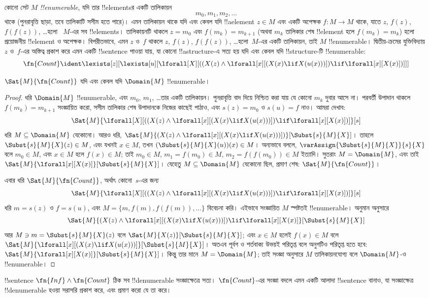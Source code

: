 \documentclass[../../../include/open-logic-section]{subfiles}
\begin{document}
কোনো সেট $M$ \emph{!!{enumerable}}, যদি তার !!{element}sর একটি
তালিকায়ন
\[
m_0, m_1, m_2, \dots
\]
থাকে (পুনরাবৃত্তি ছাড়া, তবে তালিকাটি সসীম হতে পারে)। এমন তালিকায়ন
থাকে যদি এবং কেবল যদি !!a{element} $z \in M$ এবং একটি অপেক্ষক
$f\colon M \to M$ থাকে, যাতে $z$, $f(z)$, $f(f(z))$, \dots হলো
~$M$-এর সব !!{element}s। তালিকায়নটি থাকলে $z = m_0$ এবং
$f(m_k) = m_{k+1}$ (অথবা $m_k$ তালিকার শেষ !!{element} হলে
$f(m_k) = m_k$) হলো প্রয়োজনীয় !!{element} ও অপেক্ষক। বিপরীতভাবে, এমন
$z$ ও~$f$ থাকলে $z$, $f(z)$, $f(f(z))$, \dots হলো~$M$-এর একটি
তালিকায়ন, তাই $M$ !!{enumerable}। দ্বিতীয়-ক্রমের যুক্তিবিদ্যায় $z$
ও~$f$-এর অস্তিত্ব প্রকাশ করে এমন একটি !!{sentence} পাওয়া যায়, যা
কোনো !!a{structure}-এ সত্য হয় যদি এবং কেবল যদি !!{structure}-টি
!!{enumerable}:
\[
\fn{Count} \ident
\lexists[z][\lexists[u][\lforall[X][((X(z) \land
      \lforall[x][(X(x) \lif X(u(x)))]) \lif \lforall[x][X(x)])]]]
\]

\begin{prop}
$\Sat{M}{\fn{Count}}$ যদি এবং কেবল যদি $\Domain{M}$
!!{enumerable}।
\end{prop}

\begin{proof}
ধরি $\Domain{M}$ !!{enumerable}, এবং $m_0$, $m_1$, \dots তার একটি
তালিকায়ন। পুনরাবৃত্তি বাদ দিয়ে নিশ্চিত করা যায় যে কোনো $m_k$ দুবার
আসে না। পরবর্তী উপাদান থাকলে $f(m_k) = m_{k+1}$ সংজ্ঞায়িত করো, সসীম
তালিকার শেষ উপাদানকে নিজের কাছেই পাঠাও, এবং $s(z) = m_0$ ও
$s(u) = f$ নাও। আমরা দেখাব:
\[
\Sat{M}{\lforall[X][((X(z) \land \lforall[x][(X(x) \lif X(u(x)))])
    \lif \lforall[x][X(x)])]}[s]
\]
ধরি $M \subseteq \Domain{M}$ যেকোনো। আরও ধরি,
$\Sat{M}{(X(z) \land \lforall[x][(X(x) \lif
X(u(x)))])}[\Subst{s}{M}{X}]$। তাহলে $\Subst{s}{M}{X}(z) \in M$, এবং
যখনই $x \in M$, তখন $(\Subst{s}{M}{X}(u))(x) \in M$। অন্যভাবে বললে,
$\varAssign{\Subst{s}{M}{X}}{s}{X}$ বলে $m_0 \in M$, এবং $x \in M$
হলে $f(x) \in M$; তাই $m_0 \in M$, $m_1 = f(m_0) \in M$, $m_2 =
f(f(m_0)) \in M$ ইত্যাদি। সুতরাং $M = \Domain{M}$, এবং তাই
$\Sat{M}{\lforall[x][X(x)]}[\Subst{s}{M}{X}]$। যেহেতু $M \subseteq
\Domain{M}$ যেকোনো ছিল, প্রমাণ শেষ:
$\Sat{M}{\fn{Count}}$।

এবার ধরি $\Sat{M}{\fn{Count}}$, অর্থাৎ কোনো~$s$-এর জন্য
\[
\Sat{M}{\lforall[X][((X(z) \land \lforall[x][(X(x) \lif X(u(x)))])
    \lif \lforall[x][X(x)])]}[s]
\]
ধরি $m = s(z)$ ও $f = s(u)$, এবং $M = \{m, f(m), f(f(m)), \dots\}$
বিবেচনা করি। এইভাবে সংজ্ঞায়িত $M$ স্পষ্টতই !!{enumerable}। অনুমান
অনুসারে
\[
\Sat{M}{(X(z) \land \lforall[x][(X(x) \lif X(u(x)))])
    \lif \lforall[x][X(x)]}[\Subst{s}{M}{X}]
\]
আর $M \ni m = \Subst{s}{M}{X}(z)$ বলে
$\Sat{M}{X(z)}[\Subst{s}{M}{X}]$; এবং $x \in M$ হলেই $f(x) \in M$
বলে $\Sat{M}{\lforall[x][(X(x) \lif
X(u(x)))]}[\Subst{s}{M}{X}]$। অতএব পূর্বগ ও শর্তবাক্য উভয়ই পরিতৃপ্ত
বলে অনুগটিও পরিতৃপ্ত হতে হবে:
$\Sat{M}{\lforall[x][X(x)]}[\Subst{s}{M}{X}]$। কিন্তু তার মানে
$M = \Domain{M}$; তাই সংজ্ঞা অনুসারে $M$ তালিকায়নযোগ্য বলে
$\Domain{M}$-ও !!{enumerable}।
\end{proof}

\begin{prob}
!!{sentence} $\fn{Inf} \land \fn{Count}$ ঠিক সব !!{denumerable}
সংজ্ঞাক্ষেত্রে সত্য। $\fn{Count}$-এর সংজ্ঞা বদলে এমন একটি আলাদা
!!{sentence} বানাও, যা সংজ্ঞাক্ষেত্র !!{denumerable} হওয়া সরাসরি প্রকাশ করে,
এবং প্রমাণ করো যে তা করে।
\end{prob}
\end{document}
